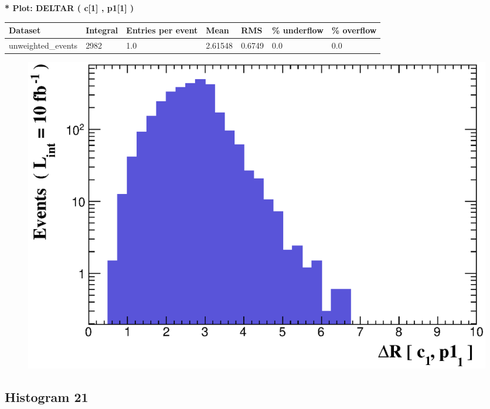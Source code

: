 \documentclass[a4paper, 10pt]{article}
\begin{document}
\textbf{* Plot: DELTAR ( c[1] , p1[1] ) }\\
   \begin{table}[H]
  \begin{center}
    \begin{tabular}{|m{23.0mm}|m{23.0mm}|m{18.0mm}|m{19.0mm}|m{19.0mm}|m{19.0mm}|m{19.0mm}|}
      \hline
      {\cellcolor{yellow}         Dataset}& {\cellcolor{yellow}         Integral}& {\cellcolor{yellow}         Entries per event}& {\cellcolor{yellow}         Mean}& {\cellcolor{yellow}         RMS}& {\cellcolor{yellow}         \% underflow}& {\cellcolor{yellow}         \% overflow}\\
      \hline
      {\cellcolor{white}         unweighted\_events}& {\cellcolor{white}         2982}& {\cellcolor{white}         1.0}& {\cellcolor{white}         2.61548}& {\cellcolor{white}         0.6749}& {\cellcolor{green}         0.0}& {\cellcolor{green}         0.0}\\
\hline
    \end{tabular}
  \end{center}
\end{table}

\begin{figure}[H]
  \begin{center}
    \includegraphics[scale=0.45]{selection_19.eps}\\
\caption{   }
  \end{center}
\end{figure}
      \newpage
\subsection{ Histogram 21}
\end{document}
